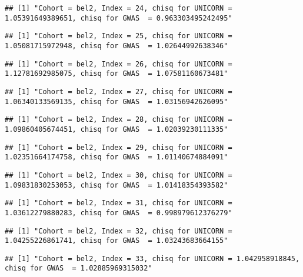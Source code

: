\documentclass[]{article}
\begin{document}
\begin{verbatim}
## [1] "Cohort = bel2, Index = 24, chisq for UNICORN = 1.05391649389651, chisq for GWAS  = 0.963303495242495"
\end{verbatim}

\begin{verbatim}
## [1] "Cohort = bel2, Index = 25, chisq for UNICORN = 1.05081715972948, chisq for GWAS  = 1.02644992638346"
\end{verbatim}

\begin{verbatim}
## [1] "Cohort = bel2, Index = 26, chisq for UNICORN = 1.12781692985075, chisq for GWAS  = 1.07581160673481"
\end{verbatim}

\begin{verbatim}
## [1] "Cohort = bel2, Index = 27, chisq for UNICORN = 1.06340133569135, chisq for GWAS  = 1.03156942626095"
\end{verbatim}

\begin{verbatim}
## [1] "Cohort = bel2, Index = 28, chisq for UNICORN = 1.09860405674451, chisq for GWAS  = 1.02039230111335"
\end{verbatim}

\begin{verbatim}
## [1] "Cohort = bel2, Index = 29, chisq for UNICORN = 1.02351664174758, chisq for GWAS  = 1.01140674884091"
\end{verbatim}

\begin{verbatim}
## [1] "Cohort = bel2, Index = 30, chisq for UNICORN = 1.09831830253053, chisq for GWAS  = 1.01418354393582"
\end{verbatim}

\begin{verbatim}
## [1] "Cohort = bel2, Index = 31, chisq for UNICORN = 1.03612279880283, chisq for GWAS  = 0.998979612376279"
\end{verbatim}

\begin{verbatim}
## [1] "Cohort = bel2, Index = 32, chisq for UNICORN = 1.04255226861741, chisq for GWAS  = 1.03243683664155"
\end{verbatim}

\begin{verbatim}
## [1] "Cohort = bel2, Index = 33, chisq for UNICORN = 1.042958918845, chisq for GWAS  = 1.02885969315032"
\end{verbatim}
\end{document}
